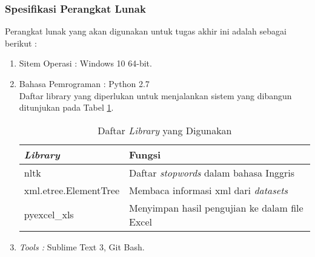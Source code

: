 \documentclass[../Book.tex]{subfiles}
\begin{document}
\subsubsection{Spesifikasi Perangkat Lunak}
Perangkat lunak yang akan digunakan untuk tugas akhir ini adalah sebagai berikut : 
\begin{enumerate}
	\item Sitem Operasi : Windows 10 64-bit.
	\item Bahasa Pemrograman : Python 2.7 \\
	Daftar library yang diperlukan untuk menjalankan sistem yang dibangun ditunjukan pada Tabel \ref{tab:lib}.
	
	\begin{table}[H]
		\centering
		\caption{Daftar \textit{Library} yang Digunakan}
		\label{tab:lib}
		\begin{tabular}{@{}ll@{}}
			\toprule
			\textit{Library}               & Fungsi                                 \\ \midrule
			nltk                  & Daftar \textit{stopwords} dalam bahasa Inggris  \\
			xml.etree.ElementTree & Membaca informasi xml dari \textit{datasets}         \\
			pyexcel\_xls          & Menyimpan hasil pengujian ke dalam file Excel \\ \bottomrule
		\end{tabular}
	\end{table}
	
	\item \textit{Tools :} Sublime Text 3, Git Bash.
	
\end{enumerate}
\end{document}
